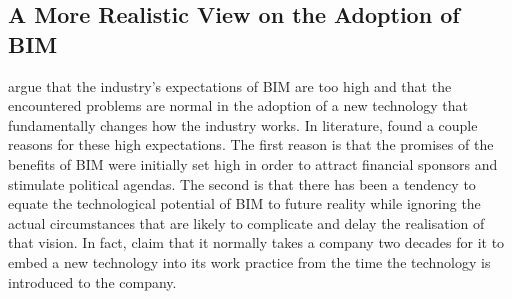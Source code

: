 \subsection{A More Realistic View on the Adoption of BIM}
\cite{Miettinen2014} argue that the industry's expectations of BIM are too high and that the encountered problems are normal in the adoption of a new technology that fundamentally changes how the industry works.
In literature, \cite{Miettinen2014} found a couple reasons for these high expectations.
The first reason is that the promises of the benefits of BIM were initially set high in order to attract financial sponsors and stimulate political agendas.
The second is that there has been a tendency to equate the technological potential of BIM to future reality while ignoring the actual circumstances that are likely to complicate and delay the realisation of that vision.
In fact, \cite{Miettinen2014} claim that it normally takes a company two decades for it to embed a new technology into its work practice from the time the technology is introduced to the company.




















